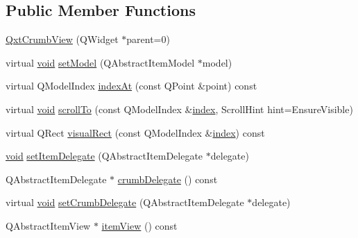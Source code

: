 \subsection*{Public Member Functions}
\begin{DoxyCompactItemize}
\item 
\hyperlink{class_qxt_crumb_view_a5684bb127a0fdcc6f6dc45d5656c73a9}{Qxt\-Crumb\-View} (Q\-Widget $\ast$parent=0)
\item 
virtual \hyperlink{group___u_a_v_objects_plugin_ga444cf2ff3f0ecbe028adce838d373f5c}{void} \hyperlink{class_qxt_crumb_view_a5e2efe1b9c050329c4c2578d8f4eeb54}{set\-Model} (Q\-Abstract\-Item\-Model $\ast$model)
\item 
virtual Q\-Model\-Index \hyperlink{class_qxt_crumb_view_ae65f76f173cb4068499f01e5f4843aad}{index\-At} (const Q\-Point \&point) const 
\item 
virtual \hyperlink{group___u_a_v_objects_plugin_ga444cf2ff3f0ecbe028adce838d373f5c}{void} \hyperlink{class_qxt_crumb_view_a9ff0fef31c00fc928ec59826e4b49678}{scroll\-To} (const Q\-Model\-Index \&\hyperlink{glext_8h_ab47dd9958bcadea08866b42bf358e95e}{index}, Scroll\-Hint hint=Ensure\-Visible)
\item 
virtual Q\-Rect \hyperlink{class_qxt_crumb_view_a78a33aa164d9621c783f6b739ec769e8}{visual\-Rect} (const Q\-Model\-Index \&\hyperlink{glext_8h_ab47dd9958bcadea08866b42bf358e95e}{index}) const 
\item 
\hyperlink{group___u_a_v_objects_plugin_ga444cf2ff3f0ecbe028adce838d373f5c}{void} \hyperlink{class_qxt_crumb_view_af88bab28369bacf028c116927ecf5d64}{set\-Item\-Delegate} (Q\-Abstract\-Item\-Delegate $\ast$delegate)
\item 
Q\-Abstract\-Item\-Delegate $\ast$ \hyperlink{class_qxt_crumb_view_a1fbf50fcd4e1b932da55f217432fc2d4}{crumb\-Delegate} () const 
\item 
virtual \hyperlink{group___u_a_v_objects_plugin_ga444cf2ff3f0ecbe028adce838d373f5c}{void} \hyperlink{class_qxt_crumb_view_a94a7df054c12b0452f8b60110e412c0e}{set\-Crumb\-Delegate} (Q\-Abstract\-Item\-Delegate $\ast$delegate)
\item 
Q\-Abstract\-Item\-View $\ast$ \hyperlink{class_qxt_crumb_view_a21a13712879d0a76ba9f0c1566ba1971}{item\-View} () const 
\end{DoxyCompactItemize}
